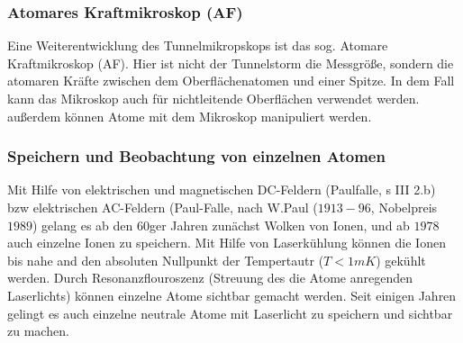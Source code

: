 \subsubsection{Atomares Kraftmikroskop (AF)} %
\label{ssub:Atomares_Kraftmikroskop_(AF)}
    Eine Weiterentwicklung des Tunnelmikropskops ist das sog. Atomare
    Kraftmikroskop (AF). Hier ist nicht der Tunnelstorm die Messgröße, sondern
    die atomaren Kräfte zwischen dem Oberflächenatomen und einer Spitze. In dem
    Fall kann das Mikroskop auch für nichtleitende Oberflächen verwendet
    werden. außerdem können Atome mit dem Mikroskop manipuliert werden.
\subsubsection{Speichern und Beobachtung von einzelnen Atomen} %
\label{ssub:Speichern_und_Beobachtung_von_einzelnen_Atomen}
    Mit Hilfe von elektrischen und magnetischen DC-Feldern (Paulfalle, s III
    2.b) bzw
    elektrischen AC-Feldern (Paul-Falle, nach W.Paul ($1913-96$, Nobelpreis $1989$)
    gelang es ab den $60$ger Jahren zunächst Wolken von Ionen, und ab $1978$ auch
    einzelne Ionen zu speichern. Mit Hilfe von Laserkühlung können die Ionen
    bis nahe and den absoluten Nullpunkt der Tempertautr ($T < 1mK$) gekühlt
    werden. Durch Resonanzflouroszenz (Streuung des die Atome anregenden
    Laserlichts) können einzelne Atome sichtbar gemacht werden. Seit einigen
    Jahren gelingt es auch einzelne neutrale Atome mit Laserlicht zu speichern
    und sichtbar zu machen.



